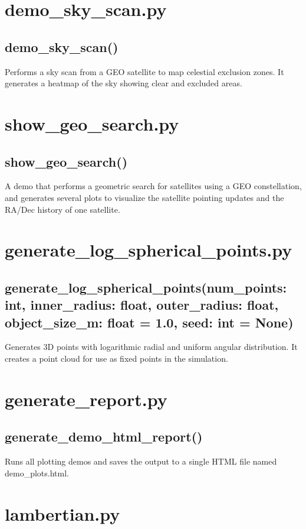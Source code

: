 \documentclass{article}
\begin{document}
\section*{demo\_sky\_scan.py}
\subsection*{demo\_sky\_scan()}
Performs a sky scan from a GEO satellite to map celestial exclusion zones. It generates a heatmap of the sky showing clear and excluded areas.

\section*{show\_geo\_search.py}
\subsection*{show\_geo\_search()}
A demo that performs a geometric search for satellites using a GEO constellation, and generates several plots to visualize the satellite pointing updates and the RA/Dec history of one satellite.

\section*{generate\_log\_spherical\_points.py}
\subsection*{generate\_log\_spherical\_points(num\_points: int, inner\_radius: float, outer\_radius: float, object\_size\_m: float = 1.0, seed: int = None)}
Generates 3D points with logarithmic radial and uniform angular distribution. It creates a point cloud for use as fixed points in the simulation.

\section*{generate\_report.py}
\subsection*{generate\_demo\_html\_report()}
Runs all plotting demos and saves the output to a single HTML file named demo\_plots.html.

\section*{lambertian.py}
\end{document}
